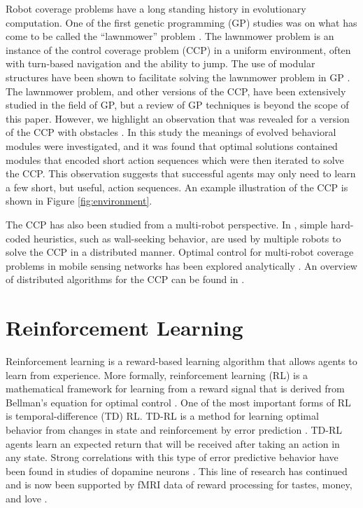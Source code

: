 \documentclass[conference]{IEEEtran}
\begin{document}
Robot coverage problems have a long standing history in evolutionary
computation. One of the first genetic programming (GP) studies was on what has
come to be called the ``lawnmower'' problem \cite{dickmanns1987genetische}. The
lawnmower problem is an instance of the control coverage problem (CCP) in a uniform environment, often with
turn-based navigation and the ability to jump. The use of modular structures have
been shown to facilitate solving the lawnmower problem in GP
\cite{koza1994genetic}. The lawnmower problem, and other versions of the CCP,
have been extensively studied in the field of GP, but a review of GP techniques
is beyond the scope of this paper. However, we highlight an observation that
was revealed for a version of the CCP with obstacles \cite{SpectorGPTPTags}. In
this study the meanings of evolved behavioral modules were investigated, and it
was found that optimal solutions contained modules that encoded short action sequences
which were then iterated to solve the CCP. This observation suggests that 
successful agents may only need to learn a few short, but useful, action sequences. 
An example illustration of the CCP is shown in Figure \ref{fig:environment}. 

The CCP has also been studied from a multi-robot perspective. In \cite{Morlok2007},
simple hard-coded heuristics, such as wall-seeking behavior, are used by
multiple robots to solve the CCP in a distributed manner. Optimal control for
multi-robot coverage problems in mobile sensing networks has been explored
analytically \cite{Cortes2004}. An overview of distributed algorithms for 
the CCP can be found in \cite{Choset2001}.

\section{Reinforcement Learning}

Reinforcement learning is a reward-based learning algorithm that allows agents
to learn from experience. More formally, reinforcement
learning (RL) is a mathematical framework for learning from a reward signal that
is derived from Bellman's equation for optimal control \cite{Sutton1998}. One of
the most important forms of RL is temporal-difference (TD) RL. TD-RL is a method
for learning optimal behavior from changes in state and reinforcement by error
prediction \cite{Sutton1988}. TD-RL agents learn an expected return that will be
received after taking an action in any state. Strong correlations with this type of
error predictive behavior have been found in studies of dopamine neurons
\cite{Schultz1993}. This line of research has continued and is now been
supported by fMRI data of reward processing for tastes, money, and love
\cite{Haber2009}.
\end{document}
